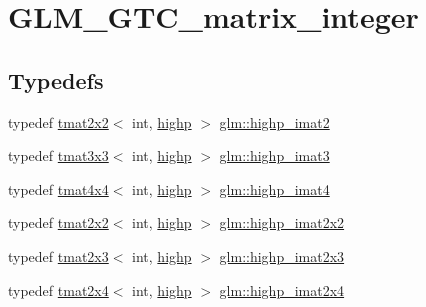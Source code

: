 \hypertarget{group__gtc__matrix__integer}{}\section{G\+L\+M\+\_\+\+G\+T\+C\+\_\+matrix\+\_\+integer}
\label{group__gtc__matrix__integer}
\subsection*{Typedefs}
\begin{DoxyCompactItemize}
\item 
typedef \mbox{\hyperlink{structglm_1_1tmat2x2}{tmat2x2}}$<$ int, \mbox{\hyperlink{namespaceglm_a0f04f086094c747d227af4425893f545ac6f7eab42eacbb10d59a58e95e362074}{highp}} $>$ \mbox{\hyperlink{group__gtc__matrix__integer_gae1cd6ff099593d2f215bd4ceed538200}{glm\+::highp\+\_\+imat2}}
\item 
typedef \mbox{\hyperlink{structglm_1_1tmat3x3}{tmat3x3}}$<$ int, \mbox{\hyperlink{namespaceglm_a0f04f086094c747d227af4425893f545ac6f7eab42eacbb10d59a58e95e362074}{highp}} $>$ \mbox{\hyperlink{group__gtc__matrix__integer_ga0766d11d0154f42893ef0912ab7c6a2c}{glm\+::highp\+\_\+imat3}}
\item 
typedef \mbox{\hyperlink{structglm_1_1tmat4x4}{tmat4x4}}$<$ int, \mbox{\hyperlink{namespaceglm_a0f04f086094c747d227af4425893f545ac6f7eab42eacbb10d59a58e95e362074}{highp}} $>$ \mbox{\hyperlink{group__gtc__matrix__integer_gaa5eedcb20883541c3f7f2862cbd0b446}{glm\+::highp\+\_\+imat4}}
\item 
typedef \mbox{\hyperlink{structglm_1_1tmat2x2}{tmat2x2}}$<$ int, \mbox{\hyperlink{namespaceglm_a0f04f086094c747d227af4425893f545ac6f7eab42eacbb10d59a58e95e362074}{highp}} $>$ \mbox{\hyperlink{group__gtc__matrix__integer_gab4411f2d106d24a32aaa3cb711dc8510}{glm\+::highp\+\_\+imat2x2}}
\item 
typedef \mbox{\hyperlink{structglm_1_1tmat2x3}{tmat2x3}}$<$ int, \mbox{\hyperlink{namespaceglm_a0f04f086094c747d227af4425893f545ac6f7eab42eacbb10d59a58e95e362074}{highp}} $>$ \mbox{\hyperlink{group__gtc__matrix__integer_ga6c1a5f4d85de3f7eccb394970320bafc}{glm\+::highp\+\_\+imat2x3}}
\item 
typedef \mbox{\hyperlink{structglm_1_1tmat2x4}{tmat2x4}}$<$ int, \mbox{\hyperlink{namespaceglm_a0f04f086094c747d227af4425893f545ac6f7eab42eacbb10d59a58e95e362074}{highp}} $>$ \mbox{\hyperlink{group__gtc__matrix__integer_gae7502957eb2ab9268726d87389ae2b55}{glm\+::highp\+\_\+imat2x4}}
\item 

\end{DoxyCompactItemize}
